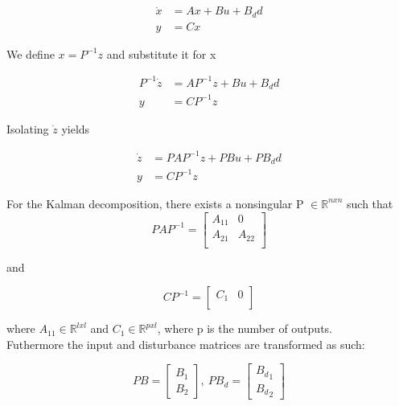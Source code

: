 \begin{equation}
	\begin{split}
		\dot{x} & = Ax + Bu + B_dd \\
		y & = Cx
	\end{split}
\end{equation}

We define $x = P^{-1}z$ and substitute it for x

\begin{equation}
	\begin{split}
		P^{-1}\dot{z} & = AP^{-1}z + Bu + B_dd \\
		y & = CP^{-1}z
	\end{split}
\end{equation}

Isolating $\dot{z}$ yields

\begin{equation}
	\begin{split}
		\dot{z} & = PAP^{-1}z + PBu + PB_dd \\
		y & = CP^{-1}z
	\end{split}
\end{equation}

For the Kalman decomposition, there exists a nonsingular P  $\in \mathbb{R} ^{n x n}$ such that
\begin{equation}
	PAP^{-1} = \begin{bmatrix}
		A_{11}       & 0 \\
		A_{21}       & A_{22} \\
	\end{bmatrix}
\end{equation}

and

\begin{equation}
	CP^{-1} = \begin{bmatrix}
		C_{1}       & 0 \\
	\end{bmatrix}
\end{equation}

where $A_{11} \in \mathbb{R} ^{l x l}$ and $C_{1} \in \mathbb{R} ^{p x l}$, where p is the number of outputs.\\Futhermore the input and disturbance matrices are transformed as such:

\begin{equation}
	PB = \begin{bmatrix}
		B_1 \\
		B_2
	\end{bmatrix}, \
	PB_d = \begin{bmatrix}
		{B_d}_1 \\
		{B_d}_2
	\end{bmatrix}
\end{equation}


